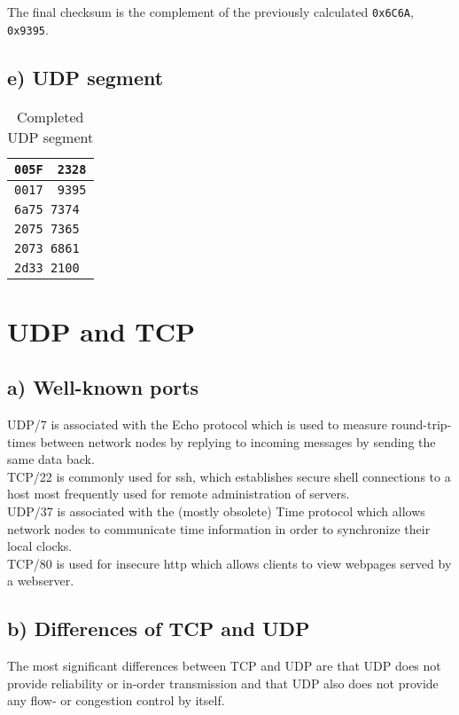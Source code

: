 \documentclass[a4paper, 11 pt, article, accentcolor=tud7b]{tudreport}
\begin{document}
	The final checksum is the complement of the previously calculated \verb|0x6C6A|, \verb|0x9395|.
	
	\subsection*{e) UDP segment}
	\begin{table}[h]
	  \centering
    \begin{tabular}{|l|l|}
      \hline
      \texttt{005F} & \texttt{2328} \\ \hline
      \texttt{0017} & \texttt{9395} \\ \hline
      \multicolumn{2}{|l|}{\texttt{6a75 7374}} \\
      \multicolumn{2}{|l|}{\texttt{2075 7365}} \\
      \multicolumn{2}{|l|}{\texttt{2073 6861}} \\
      \multicolumn{2}{|l|}{\texttt{2d33 2100}} \\\hline
    \end{tabular}
    \caption{Completed UDP segment}
  \end{table}
	
	\section{UDP and TCP}
	
	\subsection*{a) Well-known ports}
	UDP/7 is associated with the Echo protocol which is used to measure round-trip-times between network nodes by replying to incoming messages by sending the same data back. \medskip \\
	TCP/22 is commonly used for ssh, which establishes secure shell connections to a host most frequently used for remote administration of servers. \medskip \\
	UDP/37 is associated with the (mostly obsolete) Time protocol which allows network nodes to communicate time information in order to synchronize their local clocks.  \medskip \\
	TCP/80 is used for insecure http which allows clients to view webpages served by a webserver.
	
	\subsection*{b) Differences of TCP and UDP}
	The most significant differences between TCP and UDP are that UDP does not provide reliability or in-order transmission and that UDP also does not provide any flow- or congestion control by itself.
	
\end{document}
